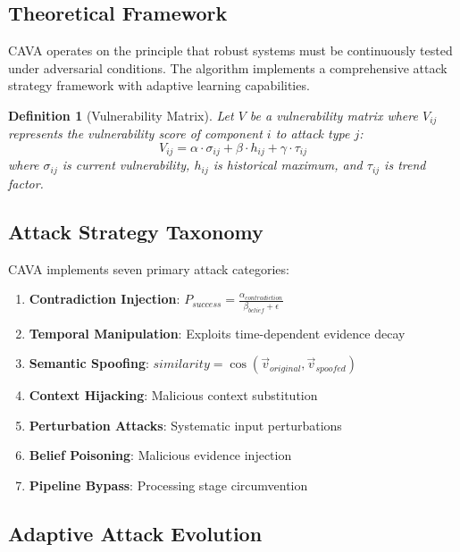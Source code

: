 \documentclass[12pt,a4paper]{article}
\newtheorem{definition}[theorem]{Definition}
\begin{document}
\subsection{Theoretical Framework}

CAVA operates on the principle that robust systems must be continuously tested under adversarial conditions. The algorithm implements a comprehensive attack strategy framework with adaptive learning capabilities.

\begin{definition}[Vulnerability Matrix]
Let $V$ be a vulnerability matrix where $V_{ij}$ represents the vulnerability score of component $i$ to attack type $j$:
\begin{equation}
V_{ij} = \alpha \cdot \sigma_{ij} + \beta \cdot h_{ij} + \gamma \cdot \tau_{ij}
\end{equation}
where $\sigma_{ij}$ is current vulnerability, $h_{ij}$ is historical maximum, and $\tau_{ij}$ is trend factor.
\end{definition}

\subsection{Attack Strategy Taxonomy}

CAVA implements seven primary attack categories:

\begin{enumerate}
\item \textbf{Contradiction Injection}: $P_{success} = \frac{\alpha_{contradiction}}{\beta_{belief} + \epsilon}$
\item \textbf{Temporal Manipulation}: Exploits time-dependent evidence decay
\item \textbf{Semantic Spoofing}: $similarity = \cos(\vec{v}_{original}, \vec{v}_{spoofed})$
\item \textbf{Context Hijacking}: Malicious context substitution
\item \textbf{Perturbation Attacks}: Systematic input perturbations
\item \textbf{Belief Poisoning}: Malicious evidence injection
\item \textbf{Pipeline Bypass}: Processing stage circumvention
\end{enumerate}

\subsection{Adaptive Attack Evolution}
\end{document}
